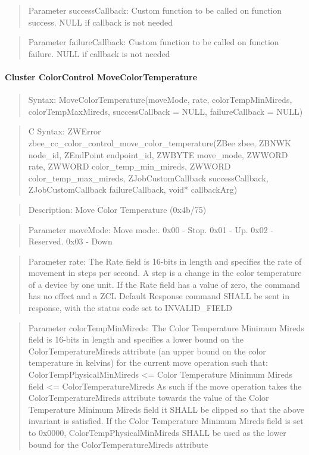 \begin{quote}Parameter successCallback: Custom function to be called on function success. NULL if callback is not needed\end{quote}
\begin{quote}Parameter failureCallback: Custom function to be called on function failure. NULL if callback is not needed\end{quote}


\paragraph{Cluster ColorControl MoveColorTemperature}
\begin{quote}Syntax: MoveColorTemperature(moveMode, rate, colorTempMinMireds, colorTempMaxMireds, successCallback = NULL, failureCallback = NULL)\end{quote}
\begin{quote}C Syntax: ZWError zbee\_cc\_color\_control\_move\_color\_temperature(ZBee zbee, ZBNWK node\_id, ZEndPoint endpoint\_id, ZWBYTE move\_mode, ZWWORD rate, ZWWORD color\_temp\_min\_mireds, ZWWORD color\_temp\_max\_mireds, ZJobCustomCallback successCallback, ZJobCustomCallback failureCallback, void* callbackArg)\end{quote}
\begin{quote}Description: Move Color Temperature (0x4b/75)\end{quote}
\begin{quote}Parameter moveMode: Move mode:. 0x00 - Stop. 0x01 - Up. 0x02 - Reserved. 0x03 - Down\end{quote}
\begin{quote}Parameter rate: The Rate field is 16-bits in length and specifies the rate of movement in steps per second. A step is a change in the color temperature of a device by one unit. If the Rate field has a value of zero, the command has no effect and a ZCL Default Response command SHALL be sent in response, with the status code set to INVALID\_FIELD\end{quote}
\begin{quote}Parameter colorTempMinMireds: The Color Temperature Minimum Mireds field is 16-bits in length and specifies a lower bound on the ColorTemperatureMireds attribute (an upper bound on the color temperature in kelvins) for the current move operation such that: ColorTempPhysicalMinMireds <= Color Temperature Minimum Mireds field <= ColorTemperatureMireds As such if the move operation takes the ColorTemperatureMireds attribute towards the value of the Color Temperature Minimum Mireds field it SHALL be clipped so that the above invariant is satisfied. If the Color Temperature Minimum Mireds field is set to 0x0000, ColorTempPhysicalMinMireds SHALL be used as the lower bound for the ColorTemperatureMireds attribute\end{quote}

